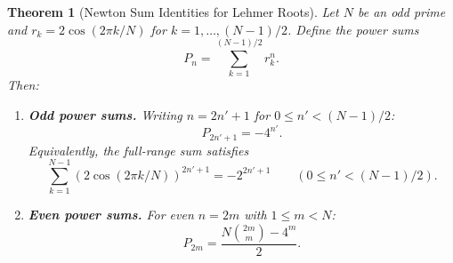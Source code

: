 \documentclass[aip,jmp,reprint,superscriptaddress,floatfix,nofootinbib]{revtex4-2}
\newtheorem{theorem}{Theorem}
\theoremstyle{definition}
\theoremstyle{remark}
\begin{document}
\begin{theorem}[Newton Sum Identities for Lehmer
  Roots]\label{thm:newton}
Let $N$ be an odd prime and $r_k = 2\cos(2\pi k/N)$ for
$k = 1, \ldots, (N{-}1)/2$.  Define the power sums
\begin{equation}\label{eq:power-sum-def}
P_n = \sum_{k=1}^{(N-1)/2} r_k^n.
\end{equation}
Then:
\begin{enumerate}[label=(\roman*)]
\item \textbf{Odd power sums.}  Writing $n = 2n'+1$ for
$0 \le n' < (N{-}1)/2$:
\begin{equation}\label{eq:newton-odd}
P_{2n'+1} = -4^{n'}.
\end{equation}
Equivalently, the full-range sum satisfies
\begin{equation}\label{eq:newton-odd-full}
\sum_{k=1}^{N-1} (2\cos(2\pi k/N))^{2n'+1} = -2^{2n'+1}
  \qquad (0 \le n' < (N{-}1)/2).
\end{equation}

\item \textbf{Even power sums.}  For even $n = 2m$ with
$1 \le m < N$:
\begin{equation}\label{eq:newton-even}
P_{2m} = \frac{N\binom{2m}{m} - 4^m}{2}.
\end{equation}
\end{enumerate}
\end{theorem}
\end{document}
